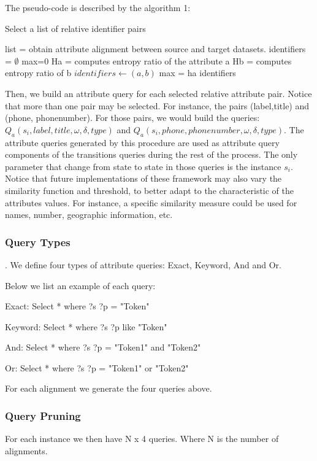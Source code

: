 The pseudo-code is described by the algorithm 1:

\begin{algorithm}
\caption{Select a list of relative identifier pairs}
\begin{algorithmic}
\STATE list = obtain attribute alignment between source and target datasets.
\STATE identifiers = $\emptyset$
\STATE max=0
\STATE Ha = computes entropy ratio of the attribute a
\STATE Hb = computes entropy ratio of b
\STATE $identifiers \leftarrow  (a,b)$
\STATE max = ha
\ENDIF
\ENDFOR
\RETURN identifiers
\end{algorithmic}
\end{algorithm}
 
Then, we build an attribute query for each selected relative attribute pair. Notice that more than one pair may be selected. For instance, the pairs (label,title) and (phone, phonenumber). For those pairs, we would build the queries: $Q_a(s_i,label,title, \omega, \delta, type)$ and $Q_a( s_i, phone, phonenumber,  \omega, \delta, type)$. The attribute queries generated by this procedure are used as attribute query components of the transitions queries during the rest of the process. The only parameter that change from state to state in those queries is the instance $s_i$. Notice that future implementations of these framework may also vary the similarity function and threshold,  to better adapt to the characteristic of the attributes values. For instance, a specific similarity measure could be used for names, number, geographic information, etc.

\subsubsection{Query Types}. We define four types of attribute queries: Exact, Keyword, And and Or. 

Below we list an example of each query:

Exact: Select * where {?s ?p  = "Token"}

Keyword: Select * where {?s ?p like "Token"}

And: Select * where {?s ?p  = "Token1" and "Token2" }

Or:  Select * where {?s ?p  = "Token1" or "Token2" }

For each alignment we generate the four queries above.

\subsubsection{Query Pruning}
For each instance we then have N x 4 queries. Where N is the number of alignments. 


